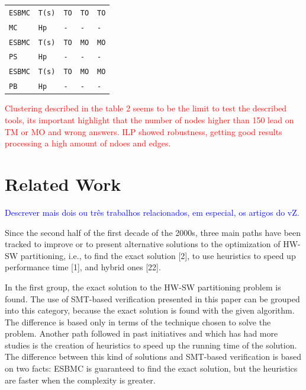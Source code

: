 \begin{table}[h]
\begin{tabular}[c]{m{1.3cm}m{1.25cm}|m{1.25cm}|m{1.25cm}|m{1.25cm}}
\verb|ESBMC| & \verb|T(s)|  & \verb|TO|  & \verb|TO| & \verb|TO|\\
\verb|MC| & \verb|Hp| & \verb|-|  & \verb|-| & \verb|-|\\
\hline

\rowcolor{Gray}
\verb|ESBMC| & \verb|T(s)| & \verb|TO|  & \verb|MO| & \verb|MO|\\
\rowcolor{Gray}
\verb|PS| & \verb|Hp| & \verb|-|  & \verb|-| & \verb|-|\\
\hline

\verb|ESBMC| & \verb|T(s)| & \verb|TO|  & \verb|MO| & \verb|MO|\\
\verb|PB| & \verb|Hp| & \verb|-|  & \verb|-| & \verb|-|\\
\bottomrule[1.5pt]

\end{tabular}
\end{table}
\textcolor{Red}{Clustering described in the table 2 seems to be the limit to test the described tools, its important highlight that the number of nodes higher than 150 lead on TM or MO and wrong answers. ILP showed robustness, getting good results processing a high amount of ndoes and edges.}

\section{Related Work}

\textcolor{blue}{Descrever mais dois ou três trabalhos relacionados, em especial, os artigos do vZ.}

Since the second half of the first decade of the 2000s, three main paths have been tracked to improve or to present alternative solutions to the optimization of HW-SW partitioning, i.e., to find the exact solution [2], to use heuristics to speed up performance time [1], and hybrid ones [22].

In the first group, the exact solution to the HW-SW partitioning problem is found. The use of SMT-based verification presented in this paper can be grouped into this category, because the exact solution is found with the given algorithm. The difference is based only in terms of the technique chosen to solve the problem.
Another path followed in past initiatives and which has had more studies is the creation of heuristics to speed up the running time of the solution. The difference between this kind of solutions and SMT-based verification is based on two facts: ESBMC is guaranteed to find the exact solution, but the heuristics are faster when the complexity is greater.

